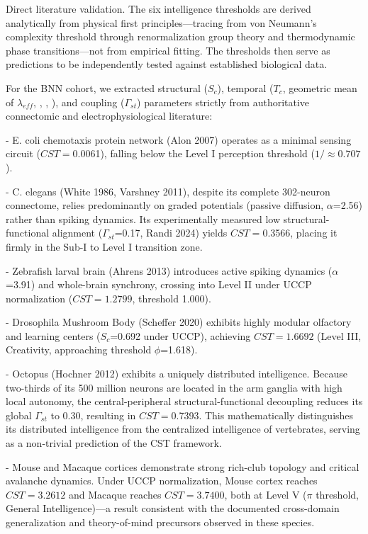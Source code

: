 \documentclass[a4paper,12pt]{article}
\begin{document}
Direct literature validation. The six intelligence thresholds are derived analytically from physical first principles---tracing from von Neumann's complexity threshold through renormalization group theory and thermodynamic phase transitions---not from empirical fitting. The thresholds then serve as predictions to be independently tested against established biological data.


For the BNN cohort, we extracted structural ($S_{c}$), temporal ($T_{c}$, geometric mean of $\lambda_{eff}$, \Phi, \Psi, \Theta), and coupling ($\Gamma_{st}$) parameters strictly from authoritative connectomic and electrophysiological literature:


- E. coli chemotaxis protein network (Alon 2007) operates as a minimal sensing circuit ($CST = $0.0061), falling below the Level I perception threshold ($1/$$ \approx 0.707$).


- C. elegans (White 1986, Varshney 2011), despite its complete 302-neuron connectome, relies predominantly on graded potentials (passive diffusion, $\alpha$=2.56) rather than spiking dynamics. Its experimentally measured low structural-functional alignment ($\Gamma_{st}$=0.17, Randi 2024) yields $CST = $0.3566, placing it firmly in the Sub-I to Level I transition zone.


- Zebrafish larval brain (Ahrens 2013) introduces active spiking dynamics ($\alpha$=3.91) and whole-brain synchrony, crossing into Level II under UCCP normalization ($CST = 1.2799$, threshold 1.000).


- Drosophila Mushroom Body (Scheffer 2020) exhibits highly modular olfactory and learning centers ($S_{c}$=0.692 under UCCP), achieving $CST = 1.6692$ (Level III, Creativity, approaching threshold $\phi$=1.618).


- Octopus (Hochner 2012) exhibits a uniquely distributed intelligence. Because two-thirds of its 500 million neurons are located in the arm ganglia with high local autonomy, the central-peripheral structural-functional decoupling reduces its global $\Gamma_{st}$ to 0.30, resulting in $CST = $0.7393. This mathematically distinguishes its distributed intelligence from the centralized intelligence of vertebrates, serving as a non-trivial prediction of the CST framework.


- Mouse and Macaque cortices demonstrate strong rich-club topology and critical avalanche dynamics. Under UCCP normalization, Mouse cortex reaches $CST = 3.2612$ and Macaque reaches $CST = 3.7400$, both at Level V ($\pi$ threshold, General Intelligence)---a result consistent with the documented cross-domain generalization and theory-of-mind precursors observed in these species.
\end{document}
